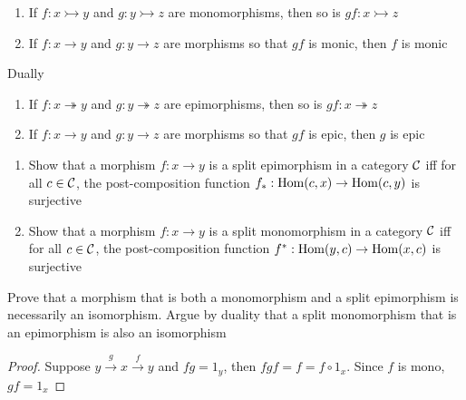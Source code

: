 \documentclass[11pt]{article}
\begin{document}
\begin{lemma}[]
\begin{enumerate}
\item If \(f:x\rightarrowtail y\) and \(g:y\rightarrowtail z\) are monomorphisms, then so
is \(gf:x\rightarrowtail z\)
\item If \(f:x\to y\) and \(g:y\to z\) are morphisms so that \(gf\) is monic, then \(f\) is monic
\end{enumerate}


Dually
\begin{enumerate}
\item If \(f:x\twoheadrightarrow y\) and \(g:y\twoheadrightarrow z\) are epimorphisms, then so
is \(gf:x\twoheadrightarrow z\)
\item If \(f:x\to y\) and \(g:y\to z\) are morphisms so that \(gf\) is epic, then \(g\) is epic
\end{enumerate}
\end{lemma}

\begin{exercise}
\label{ex1.2.2}
\begin{enumerate}
\item Show that a morphism \(f:x\to y\) is a split epimorphism in a category \(\mathcal{C}\) iff for
all \(c\in\mathcal{C}\), the post-composition function \(f_*:\operatorname{Hom}(c,x)\to\operatorname{Hom}(c,y)\) is surjective
\item Show that a morphism \(f:x\to y\) is a split monomorphism in a category \(\mathcal{C}\) iff for
all \(c\in\mathcal{C}\), the post-composition function \(f^*:\operatorname{Hom}(y,c)\to\operatorname{Hom}(x,c)\) is surjective
\end{enumerate}
\end{exercise}

\begin{exercise}
\label{ex1.2.6}
Prove that a morphism that is both a monomorphism and a split epimorphism is necessarily an
isomorphism. Argue by duality that a split monomorphism that is an epimorphism is also an isomorphism
\end{exercise}

\begin{proof}
Suppose \(y\xrightarrow{g}x\xrightarrow{f}y\) and \(fg=1_y\), then \(fgf=f=f\circ 1_x\). Since \(f\) is mono, \(gf=1_x\)
\end{proof}
\end{document}
